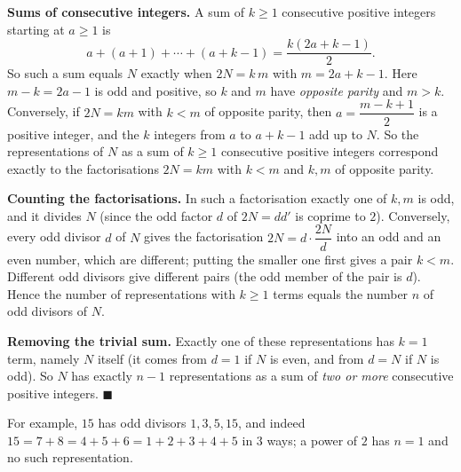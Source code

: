 \textbf{Sums of consecutive integers.} A sum of $k\ge1$ consecutive positive integers starting at $a\ge1$ is
\[
a+(a+1)+\cdots+(a+k-1)=\dfrac{k(2a+k-1)}{2}.
\]
So such a sum equals $N$ exactly when $2N=k\,m$ with $m=2a+k-1$. Here $m-k=2a-1$ is odd and positive, so $k$ and $m$ have \emph{opposite parity} and $m>k$. Conversely, if $2N=km$ with $k<m$ of opposite parity, then $a=\dfrac{m-k+1}{2}$ is a positive integer, and the $k$ integers from $a$ to $a+k-1$ add up to $N$. So the representations of $N$ as a sum of $k\ge1$ consecutive positive integers correspond exactly to the factorisations $2N=km$ with $k<m$ and $k,m$ of opposite parity.

\textbf{Counting the factorisations.} In such a factorisation exactly one of $k,m$ is odd, and it divides $N$ (since the odd factor $d$ of $2N=dd'$ is coprime to $2$). Conversely, every odd divisor $d$ of $N$ gives the factorisation $2N=d\cdot\dfrac{2N}{d}$ into an odd and an even number, which are different; putting the smaller one first gives a pair $k<m$. Different odd divisors give different pairs (the odd member of the pair is $d$). Hence the number of representations with $k\ge1$ terms equals the number $n$ of odd divisors of $N$.

\textbf{Removing the trivial sum.} Exactly one of these representations has $k=1$ term, namely $N$ itself (it comes from $d=1$ if $N$ is even, and from $d=N$ if $N$ is odd). So $N$ has exactly $n-1$ representations as a sum of \emph{two or more} consecutive positive integers. $\blacksquare$

For example, $15$ has odd divisors $1,3,5,15$, and indeed $15=7+8=4+5+6=1+2+3+4+5$ in $3$ ways; a power of $2$ has $n=1$ and no such representation.
